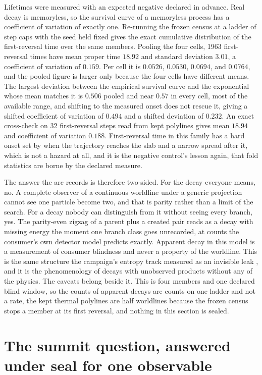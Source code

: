 \documentclass[aps,pre,reprint,nofootinbib,floatfix]{revtex4-2}
\begin{document}
Lifetimes were measured with an expected negative declared in advance.
Real decay is memoryless, so the survival curve of a memoryless process
has a coefficient of variation of exactly one.  Re-running the frozen
census at a ladder of step caps with the seed held fixed gives the
exact cumulative distribution of the first-reversal time over the same
members.  Pooling the four cells, 1963 first-reversal times have mean
proper time $18.92$ and standard deviation $3.01$, a coefficient of
variation of $0.159$.  Per cell it is $0.0526$, $0.0530$, $0.0694$, and
$0.0764$, and the pooled figure is larger only because the four cells
have different means.  The largest deviation between the empirical
survival curve and the exponential whose mean matches it is $0.506$
pooled and near $0.57$ in every cell, most of the available range, and
shifting to the measured onset does not rescue it, giving a shifted
coefficient of variation of $0.494$ and a shifted deviation of
$0.232$.  An exact cross-check on 32 first-reversal steps read from
kept polylines gives mean $18.94$ and coefficient of variation
$0.188$.  First-reversal time in this family has a hard onset set by
when the trajectory reaches the slab and a narrow spread after it,
which is not a hazard at all, and it is the negative control's lesson
again, that fold statistics are borne by the declared measure.

The answer the arc records is therefore two-sided.  For the decay
everyone means, no.  A complete observer of a continuous worldline
under a generic projection cannot see one particle become two, and that
is parity rather than a limit of the search.  For a decay nobody can
distinguish from it without seeing every branch, yes.  The parity-even
zigzag of a parent plus a created pair reads as a decay with missing
energy the moment one branch class goes unrecorded, at counts the
consumer's own detector model predicts exactly.  Apparent decay in this
model is a measurement of consumer blindness and never a property of
the worldline.  This is the same structure the campaign's entropy track
measured as an invisible leak \cite{ZenodoEntropy}, and it is the
phenomenology of decays with unobserved products without any of the
physics.  The caveats belong beside it.  This is four members and one
declared blind window, so the counts of apparent decays are counts on
one ladder and not a rate, the kept thermal polylines are half
worldlines because the frozen census stops a member at its first
reversal, and nothing in this section is sealed.

\section{The summit question, answered under seal for one observable}
\label{sec:summit}
\end{document}
